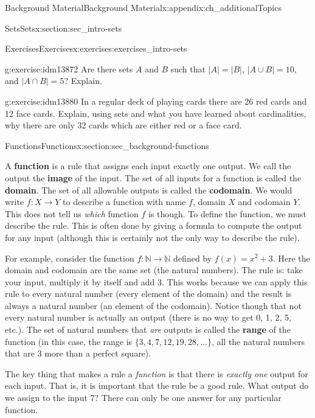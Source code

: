 \documentclass[oneside,10pt,]{book}
\newcommand{\terminology}[1]{\textbf{#1}}
\numberwithin{equation}{chapter}
\def\N{\mathbb N}
\begin{document}
\begin{appendixptx}{Background Material}{}{Background Material}{}{}{x:appendix:ch_additionalTopics}
\begin{sectionptx}{Sets}{}{Sets}{}{}{x:section:sec_intro-sets}
\begin{exercises-subsection}{Exercises}{}{Exercises}{}{}{x:exercises:exercises_intro-sets}
\begin{divisionexercise}{15}{}{}{g:exercise:idm13872}
Are there sets \(A\) and \(B\) such that \(|A| = |B|\), \(|A\cup B| = 10\), and \(|A\cap B| = 5\)? Explain.%
\end{divisionexercise}%
\begin{divisionexercise}{16}{}{}{g:exercise:idm13880}%
In a regular deck of playing cards there are 26 red cards and 12 face cards. Explain, using sets and what you have learned about cardinalities, why there are only 32 cards which are either red or a face card.%
\end{divisionexercise}%
\end{exercises-subsection}
\end{sectionptx}
%
%
\typeout{************************************************}
\typeout{************************************************}
%
\begin{sectionptx}{Functions}{}{Functions}{}{}{x:section:sec_background-functions}
\(\textit{}\)\begin{introduction}{}%
A \terminology{function} is a rule that assigns each input exactly one output.  We call the output the \terminology{image} of the input.  The set of all inputs for a function is called the \terminology{domain}. The set of all allowable outputs is called the \terminology{codomain}. We would write \(f:X \to Y\) to describe a function with name \(f\), domain \(X\) and codomain \(Y\). This does not tell us \emph{which} function \(f\) is though. To define the function, we must describe the rule. This is often done by giving a formula to compute the output for any input (although this is certainly not the only way to describe the rule).%
\par
For example, consider the function \(f:\N \to \N\) defined by \(f(x) = x^2 + 3\). Here the domain and codomain are the same set (the natural numbers). The rule is: take your input, multiply it by itself and add 3. This works because we can apply this rule to every natural number (every element of the domain) and the result is always a natural number (an element of the codomain). Notice though that not every natural number is actually an output (there is no way to get 0, 1, 2, 5, etc.). The set of natural numbers that \emph{are} outputs is called the \terminology{range} of the function (in this case, the range is \(\{3, 4, 7, 12, 19, 28, \ldots\}\), all the natural numbers that are 3 more than a perfect square).%
\par
The key thing that makes a rule a \emph{function} is that there is \emph{exactly one} output for each input. That is, it is important that the rule be a good rule. What output do we assign to the input 7? There can only be one answer for any particular function.%

\end{introduction}
\end{sectionptx}
\end{appendixptx}
\end{document}
